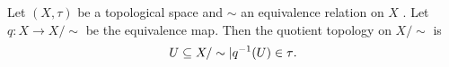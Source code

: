 Let  $ (X, \tau ) $  be a topological space and  $  \sim $  an
equivalence relation on  $ X $ . Let  $ q : X \to X/  \sim $  be the equivalence
map. Then the quotient topology on  $ X/  \sim $  is
 \[ \\{ U  \subseteq X/ \sim | q^{-1}(U) \in  \tau  \\} . \]
